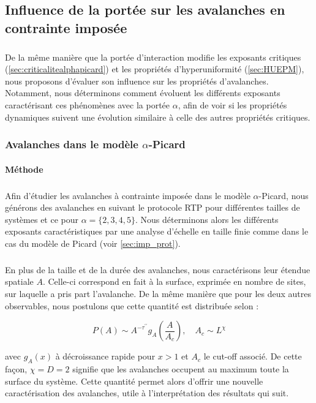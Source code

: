 \subsection{Influence de la portée sur les avalanches en contrainte imposée}

\subparagraph{}De la même manière que la portée d'interaction modifie les exposants critiques (\autoref{sec:criticalitealphapicard}) et les propriétés d'hyperuniformité (\autoref{sec:HUEPM}), nous proposons d'évaluer son influence sur les propriétés d'avalanches. Notamment, nous déterminons comment évoluent les différents exposants caractérisant ces phénomènes avec la portée $\alpha$, afin de voir si les propriétés dynamiques suivent une évolution similaire à celle des autres propriétés critiques.

\subsubsection{Avalanches dans le modèle $\alpha$-Picard}

\label{sec:Av_PicardMain}

\paragraph{Méthode}

\subparagraph{}Afin d'étudier les avalanches à contrainte imposée dans le modèle $\alpha$-Picard, nous générons des avalanches en suivant le protocole RTP pour différentes tailles de systèmes et ce pour $\alpha = \{2, 3, 4, 5\}$. Nous déterminons alors les différents exposants caractéristiques par une analyse d'échelle en taille finie comme dans le cas du modèle de Picard (voir \autoref{sec:imp_prot}). 

\subparagraph{}En plus de la taille et de la durée des avalanches, nous caractérisons leur étendue spatiale $A$. Celle-ci correspond en fait à la surface, exprimée en nombre de sites, sur laquelle a pris part l'avalanche. De la même manière que pour les deux autres observables, nous postulons que cette quantité est distribuée selon :

\begin{equation}
	P(A) \sim A^{-\tau^{\prime\prime}}g_A\left( \frac{A}{A_c} \right),\quad A_c \sim L^\chi
	\label{eq:distA}
\end{equation}

\noindent avec $g_A(x)$ à décroissance rapide pour $x>1$ et $A_c$ le cut-off associé. De cette façon, $\chi=D=2$ signifie que les avalanches occupent au maximum toute la surface du système. Cette quantité permet alors d'offrir une nouvelle caractérisation des avalanches, utile à l'interprétation des résultats qui suit.

